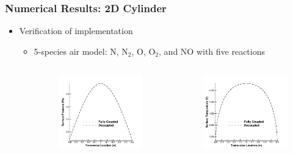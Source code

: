\documentclass{beamer}
\begin{document}
\begin{frame}
  \frametitle{Numerical Results: 2D Cylinder}
  \begin{itemize}
    \item Verification of implementation
    \begin{itemize}
      \item 5-species air model: N, $\text{N}_2$, O, $\text{O}_2$, and NO with five reactions
      \begin{columns}[t]
        \begin{column}{0.33\textwidth}
          \begin{figure}[h!]
            \includegraphics[width=\textwidth,trim={0 0 0 2cm}]{figures/surface_pressure}
          \end{figure}
        \end{column}
        \begin{column}{0.33\textwidth}
          \begin{figure}[h!]
            \includegraphics[width=\textwidth,trim={0 0 0 2cm}]{figures/surface_temperature}

\end{figure}
\end{column}
\end{columns}
\end{itemize}
\end{itemize}
\end{frame}
\end{document}
